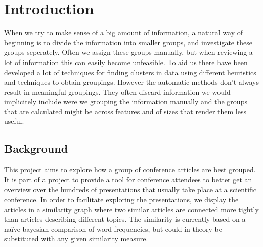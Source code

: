 \section{Introduction}

When we try to make sense of a big amount of information, a natural way 
of beginning is to divide the information into smaller groups, and 
investigate these groups seperately. Often we assign these groups 
manually, but when reviewing a lot of information this can easily become 
unfeasible. To aid us there have been developed a lot of techniques for 
finding clusters in data using different heuristics and techniques to 
obtain groupings. However the automatic methods don't always result in 
meaningful groupings. They often discard information we would 
implicitely include were we grouping the information manually and the 
groups that are calculated might be across features and of sizes that 
render them less useful.

\subsection{Background}

This project aims to explore how a group of conference articles are best 
grouped. It is part of a project to provide a tool for conference 
attendees to better get an overview over the hundreds of presentations 
that usually take place at a scientific conference. In order to 
facilitate exploring the presentations, we display the articles in a 
similarity graph where two similar articles are connected more tightly 
than articles describing different topics. The similarity is currently 
based on a na\"{i}ve bayesian comparison of word frequencies, but could 
in theory be substituted with any given similarity measure.

